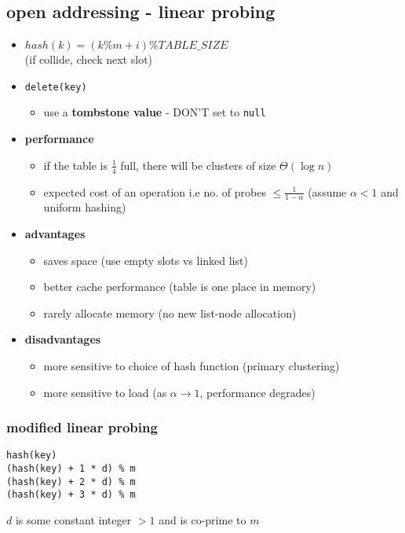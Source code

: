 \documentclass{article}
\newcommand{\code}[1]{\texttt{#1}}
\begin{document}
\begin{multicols*}{3}
    \subsection{open addressing - linear probing}
    \begin{itemize}
        \item $hash(k) = (k{\%}m + i)\%TABLE\_SIZE$
              \\(if collide, check next slot)
        \item \code{delete(key)}
              \begin{itemize}
                  \item use a \textbf{tombstone value} - DON'T set to \code{null}
              \end{itemize}
        \item \textbf{performance}
              \begin{itemize}
                  \item if the table is $\frac{1}{4}$ full, there will be clusters of size $\Theta(\log n)$
                  \item expected cost of an operation i.e no. of probes $\leq \frac{1}{1 - \alpha}$
                        (assume $\alpha < 1$ and uniform hashing)
              \end{itemize}
        \item \textbf{advantages}
              \begin{itemize}
                  \item saves space (use empty slots vs linked list)
                  \item better cache performance (table is one place in memory)
                  \item rarely allocate memory (no new list-node allocation)
              \end{itemize}
        \item \textbf{disadvantages}
              \begin{itemize}
                  \item more sensitive to choice of hash function (primary clustering)
                  \item more sensitive to load (as $\alpha \to 1$, performance degrades)
              \end{itemize}
    \end{itemize}

    \subsubsection{modified linear probing}
    \begin{lstlisting}
hash(key)
(hash(key) + 1 * d) % m
(hash(key) + 2 * d) % m
(hash(key) + 3 * d) % m
    \end{lstlisting}
    $d$ is some constant integer $>1$ and is co-prime to $m$

\end{multicols*}
\end{document}
